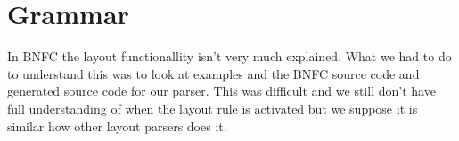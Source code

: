 \section{Grammar}


In BNFC the layout functionallity isn't very much explained. What we had to do to understand this was to look at examples and the BNFC source code and generated source code for our parser. This was difficult and we still don't have full understanding of when the layout rule is activated but we suppose it is similar how other layout parsers does it. %